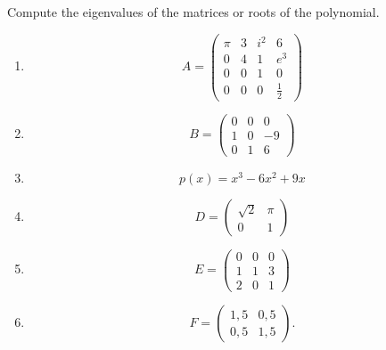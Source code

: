 Compute the eigenvalues of the matrices or roots of the polynomial.
\begin{enumerate}
	\item $$
	A = \begin{pmatrix}
	\pi& 3& i^2& 6\\
	0 & 4& 1  & e^3\\
	0 & 0& 1  & 0\\
	0 & 0& 0  & \frac{1}{2}
	\end{pmatrix}
	$$
	\item
	$$
	B = \begin{pmatrix}
	0&0&0\\
	1&0&-9\\
	0&1&6
	\end{pmatrix}
	$$
	\item 
	$$
	p(x) = x^3 - 6x^2 + 9x  
	$$
	\item $$
	D = \begin{pmatrix}
	\sqrt{2}&\pi\\
	0&1
	\end{pmatrix}
	$$
	\item
	$$
	E = \begin{pmatrix}
	0&0&0\\
	1&1&3\\
	2&0&1
	\end{pmatrix}
	$$
	\item
	$$
	F = \begin{pmatrix}
	1,5& 0,5\\
	0,5& 1,5
	\end{pmatrix}.
	$$
\end{enumerate}
 